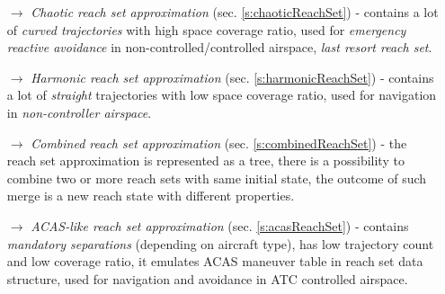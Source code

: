 \begin{itemize}
    \item[$\to$] \emph{Chaotic reach set approximation} (sec. \ref{s:chaoticReachSet}) - contains a lot of \emph{curved trajectories} with high space coverage ratio, used for \emph{emergency reactive avoidance} in non-controlled/controlled airspace, \emph{last resort reach set}.
    
    \item[$\to$] \emph{Harmonic reach set approximation} (sec. \ref{s:harmonicReachSet}) -  contains a lot of \emph{straight} trajectories with low space coverage ratio, used for navigation in \emph{non-controller airspace}.
    
    \item[$\to$] \emph{Combined reach set approximation} (sec. \ref{s:combinedReachSet}) - the reach set approximation is represented as a tree, there is a possibility to combine two or more reach sets with same initial state, the outcome of such merge is a new reach state with different properties.
    
    \item[$\to$] \emph{ACAS-like reach set approximation} (sec. \ref{s:acasReachSet}) - contains \emph{mandatory separations} (depending on aircraft type), has low trajectory count and low coverage ratio, it emulates ACAS maneuver table in reach set data structure, used for navigation and avoidance in ATC controlled airspace.
\end{itemize}


